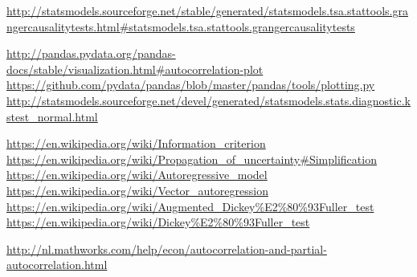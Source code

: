 \documentclass[11pt]{article}
\begin{document}
\begin{thebibliography}{1}
 \href{http://statsmodels.sourceforge.net/stable/generated/statsmodels.tsa.stattools.grangercausalitytests.html\#statsmodels.tsa.stattools.grangercausalitytests}{http://statsmodels.sourceforge.net/stable/generated/statsmodels.tsa.stattools.grangercausalitytests.html\#statsmodels.tsa.stattools.grangercausalitytests}

 \href{http://pandas.pydata.org/pandas-docs/stable/visualization.html\#autocorrelation-plot}{http://pandas.pydata.org/pandas-docs/stable/visualization.html\#autocorrelation-plot}
 \href{https://github.com/pydata/pandas/blob/master/pandas/tools/plotting.py}{https://github.com/pydata/pandas/blob/master/pandas/tools/plotting.py}
 \href{http://statsmodels.sourceforge.net/devel/generated/statsmodels.stats.diagnostic.kstest\_normal.html}{http://statsmodels.sourceforge.net/devel/generated/statsmodels.stats.diagnostic.kstest\_normal.html}


 \href{https://en.wikipedia.org/wiki/Information\_criterion}{https://en.wikipedia.org/wiki/Information\_criterion}
 \href{https://en.wikipedia.org/wiki/Propagation\_of\_uncertainty\#Simplification}{https://en.wikipedia.org/wiki/Propagation\_of\_uncertainty\#Simplification}
 \href{https://en.wikipedia.org/wiki/Autoregressive\_model}{https://en.wikipedia.org/wiki/Autoregressive\_model}
 \href{https://en.wikipedia.org/wiki/Vector\_autoregression}{https://en.wikipedia.org/wiki/Vector\_autoregression}
 \href{https://en.wikipedia.org/wiki/Augmented\_Dickey\%E2\%80\%93Fuller\_test}{https://en.wikipedia.org/wiki/Augmented\_Dickey\%E2\%80\%93Fuller\_test}
 \href{https://en.wikipedia.org/wiki/Dickey\%E2\%80\%93Fuller\_test}{https://en.wikipedia.org/wiki/Dickey\%E2\%80\%93Fuller\_test}



 \href{http://nl.mathworks.com/help/econ/autocorrelation-and-partial-autocorrelation.html}{http://nl.mathworks.com/help/econ/autocorrelation-and-partial-autocorrelation.html}


\end{thebibliography}


    \newpage 
    
    
\end{document}

